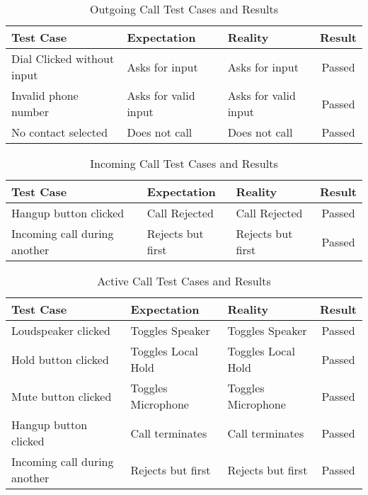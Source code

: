 \begin{table}[H]
    \centering
    \begin{tabular}{|l|l|l|c|} \hline
        Test Case & Expectation & Reality & Result \\\hline\hline
        Dial Clicked without input & Asks for input & Asks for input & Passed \\\hline
        Invalid phone number & Asks for valid input & Asks for valid input & Passed \\\hline
        No contact selected & Does not call & Does not call & Passed \\\hline
    \end{tabular}
    \caption{Outgoing Call Test Cases and Results}
    \label{tab:out_test}
\end{table}

\begin{table}[H]
    \centering
    \begin{tabular}{|l|l|l|c|} \hline
        Test Case & Expectation & Reality & Result \\\hline\hline
        Hangup button clicked & Call Rejected & Call Rejected & Passed \\\hline
        Incoming call during another & Rejects but first & Rejects but first & Passed \\\hline
    \end{tabular}
    \caption{Incoming Call Test Cases and Results}
    \label{tab:incoming_test}
\end{table}

\begin{table}[H]
    \centering
    \begin{tabular}{|l|l|l|c|} \hline
        Test Case & Expectation & Reality & Result \\\hline\hline
        Loudspeaker clicked & Toggles Speaker & Toggles Speaker & Passed \\\hline
        Hold button clicked & Toggles Local Hold & Toggles Local Hold & Passed \\\hline
        Mute button clicked & Toggles Microphone & Toggles Microphone & Passed \\\hline
        Hangup button clicked & Call terminates & Call terminates & Passed \\\hline
        Incoming call during another & Rejects but first & Rejects but first & Passed \\\hline
    \end{tabular}
    \caption{Active Call Test Cases and Results}
    \label{tab:in_call_test}
\end{table}
